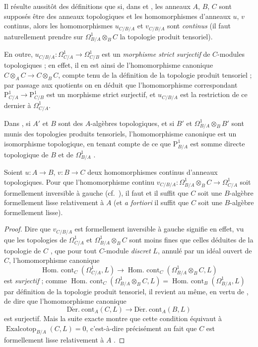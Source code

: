 \begin{env}[20.7.1]
\label{0.20.7.1-fr}
Il résulte aussitôt des définitions que si, dans  et
, les anneaux $A$, $B$, $C$ sont supposés être des anneaux
topologiques et les homomorphismes d'anneaux $u$, $v$ continus, alors les
homomorphismes $u_{C/B/A}$ et $v_{C/B/A}$ sont \emph{continus} (il faut
naturellement prendre sur $\Omega^1_{B/A}\otimes_B C$ la topologie produit
tensoriel).

En outre, $u_{C/B/A}:\Omega^1_{C/A}\to\Omega^1_{C/B}$ est un
\emph{morphisme strict surjectif} de $C$-modules topologiques ; en effet, il en
est ainsi de l'homomorphisme canonique $C\otimes_A C\to C\otimes_B C$, compte
tenu de la définition de la topologie produit tensoriel ; par passage aux
quotients on en déduit que l'homomorphisme correspondant
$\mathrm{P}^1_{C/A}\to\mathrm{P}^1_{C/B}$ est un morphisme strict surjectif,
et $u_{C/B/A}$ est la restriction de ce dernier à $\Omega^1_{C/A}$.

Dans , si $A'$ et $B$ sont des $A$-algèbres topologiques,
et si $B'$ et $\Omega^1_{B/A}\otimes_B B'$ sont munis des topologies produits
tensoriels, l'homomorphisme canonique  est un isomorphisme
topologique, en tenant compte de ce que $\mathrm{P}^1_{B/A}$ est somme directe
topologique de $B$ et de $\Omega^1_{B/A}$ .
\end{env}

\begin{proposition}[20.7.2]
\label{0.20.7.2-fr}
Soient $u:A\to B$, $v:B\to C$ deux homomorphismes continus d'anneaux
topologiques. Pour que l'homomorphisme continu
$v_{C/B/A}:\Omega^1_{B/A}\otimes_B C\to\Omega^1_{C/A}$ soit formellement
inversible à gauche (cf.\ ), il faut et il suffit que $C$
soit une $B$-algèbre formellement lisse relativement à $A$
 (et \emph{a fortiori} il suffit que $C$ soit une
$B$-algèbre formellement lisse).
\end{proposition}

\begin{proof}
Dire que $v_{C/B/A}$ est formellement inversible à gauche signifie en effet,
vu que les topologies de $\Omega^1_{C/A}$ et $\Omega^1_{B/A}\otimes_B C$
sont moins fines que celles déduites de la topologie de $C$
, que pour tout $C$-module \emph{discret} $L$, annulé par un
idéal ouvert de $C$, l'homomorphisme canonique
\[
  \operatorname{Hom.\ cont}_C(\Omega^1_{C/A},L)\to
  \operatorname{Hom.\ cont}_C(\Omega^1_{B/A}\otimes_B C,L)
\]
est \emph{surjectif}  ; comme
$\operatorname{Hom.\ cont}_C(\Omega^1_{B/A}\otimes_B C,L)=
\operatorname{Hom.\ cont}_B(\Omega^1_{B/A},L)$ par définition de la topologie
produit tensoriel, il revient au même, en vertu de , de dire
que l'homomorphisme canonique
\[
  \operatorname{D\acute{e}r.\ cont}_A(C,L)\to
  \operatorname{D\acute{e}r.\ cont}_A(B,L)
\]
est surjectif. Mais la suite exacte  montre que cette
condition équivaut à $\operatorname{Exalcotop}_{B/A}(C,L)=0$, c'est-à-dire
précisément au fait que $C$ est formellement lisse relativement à $A$
.
\end{proof}

